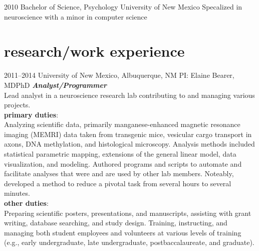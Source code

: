\documentclass[]{friggeri-cv} %
\begin{document}
\begin{entrylist}
\entry
{2010}
{{\bodyfont Bachelor of Science,} Psychology}
{University of New Mexico}
{Specalized in neuroscience with a minor in computer science}
\end{entrylist}

\section{research/work experience}

\begin{entrylist}
\entry
{\footnotesize{2011--2014}}
{University of New Mexico, Albuquerque, NM \textemdash PI: Elaine Bearer, MD\textendash PhD}
{}
{\emph{\textbf{Analyst/Programmer}} \\
Lead analyst in a neuroscience research lab 
contributing to and managing various projects. \\
\textbf{primary duties}: \\
Analyzing scientific data, primarily manganese-enhanced magnetic resonance imaging (MEMRI) data 
taken from transgenic mice,
vesicular cargo transport in axons, 
DNA methylation, and histological microscopy. Analysis methods included
statistical parametric mapping, 
extensions of the general linear model, 
data visualization, and modeling.
Authored programs and scripts to automate and facilitate analyses 
that were and are used by other lab members. 
Noteably, developed a method to reduce a pivotal task from several hours to several
minutes.\\
\textbf{other duties}: \\
Preparing scientific posters, presentations, and manuscripts, 
assisting with grant writing, database searching, and study design. 
Training, instructing, and managing both student employees and volunteers at various levels of training 
(e.g., early undergraduate, late undergraduate, postbaccalaureate, and graduate). }
\end{entrylist}
\end{document}
